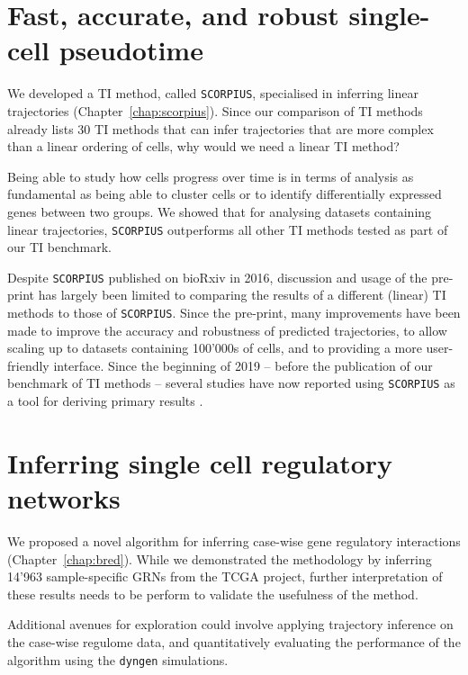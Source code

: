 

\section{Fast, accurate, and robust single-cell pseudotime}

We developed a TI method, called \texttt{SCORPIUS}, specialised in inferring linear trajectories (Chapter~\ref{chap:scorpius}). Since our comparison of TI methods already lists 30 TI methods that can infer trajectories that are more complex than a linear ordering of cells, why would we need a linear TI method?

Being able to study how cells progress over time is in terms of analysis as fundamental as being able to cluster cells or to identify differentially expressed genes between two groups. We showed that for analysing datasets containing linear trajectories, \texttt{SCORPIUS} outperforms all other TI methods tested as part of our TI benchmark. 

Despite \texttt{SCORPIUS} published on bioRxiv in 2016, discussion and usage of the pre-print has largely been limited to comparing the results of a different (linear) TI methods to those of \texttt{SCORPIUS}. Since the pre-print, many improvements have been made to improve the accuracy and robustness of predicted trajectories, to allow scaling up to datasets containing 100'000s of cells, and to providing a more user-friendly interface. Since the beginning of 2019 -- before the publication of our benchmark of TI methods -- several studies have now reported using \texttt{SCORPIUS} as a tool for deriving primary results \cite{damond_maphumantype_2019, cheng_multifactorialheterogeneityvirusspecific_2019, tibbitt_singlecellrnasequencing_2019, hove_singlecellatlasmouse_2019, wouters_singlecellgeneregulatory_2019, reimegard_combinedmrnaprotein_2019}.


\section{Inferring single cell regulatory networks}

We proposed a novel algorithm for inferring case-wise gene regulatory interactions (Chapter~\ref{chap:bred}). While we demonstrated the methodology by inferring 14'963 sample-specific GRNs from the TCGA project, further interpretation of these results needs to be perform to validate the usefulness of the method.

Additional avenues for exploration could involve applying trajectory inference on the case-wise regulome data, and quantitatively evaluating the performance of the algorithm using the \texttt{dyngen} simulations.


